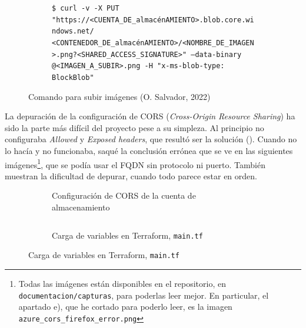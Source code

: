 \documentclass[11pt]{article}
\begin{document}
\begin{flushleft}
		\begin{figure}[htb]
			\centering
			\begin{subfigure}{\textwidth}
                \vspace{-.2cm}
				\footnotesize
				\texttt{\$ curl -v -X PUT "https://<CUENTA\_DE\_almacénAMIENTO>.blob.core.windows.net/\\<CONTENEDOR\_DE\_almacénAMIENTO>/<NOMBRE\_DE\_IMAGEN>.png?<SHARED\_ACCESS\_SIGNATURE>"\ --data-binary @<IMAGEN\_A\_SUBIR>.png -H "x-ms-blob-type: BlockBlob"} 
			\end{subfigure}
			\caption{Comando para subir imágenes (O. Salvador, 2022)}
		\end{figure}

	\clearpage
	La depuración de la configuración de CORS (\textit{Cross-Origin Resource Sharing}) ha sido la parte más difícil del proyecto pese a su simpleza. Al principio no configuraba  \textit{Allowed} y \textit{Exposed headers}, que resultó ser la solución (\cite{cors_almacen}). Cuando no lo hacía y no funcionaba, saqué la conclusión errónea que se ve en las siguientes imágenes\footnote{Todas las imágenes están disponibles en el repositorio, en \texttt{documentacion/capturas}, para poderlas leer mejor. En particular, el apartado e), que he cortado para poderlo leer, es la imagen \texttt{azure\_cors\_firefox\_error.png}}, que se podía usar el FQDN sin protocolo ni puerto. También muestran la dificultad de depurar, cuando todo parece estar en orden.
	\linebreak

		\begin{figure}[htb]
			\centering
			\begin{subfigure}{\textwidth}
				\centering
				\caption{Configuración de CORS de la cuenta de almacenamiento}
			\end{subfigure}
			\linebreak
			
			\begin{subfigure}{.92\linewidth}
				\inputminted[fontsize=\tiny, firstline=33, lastline=36, linenos, frame=single, breaklines]{javascript}{../../frontend/terraform/main.tf}
				\vspace{-.5cm}
				\caption{Carga de variables en Terraform, \texttt{main.tf}}
			\end{subfigure}
			\linebreak
			

\end{figure}
\end{flushleft}
\end{document}
